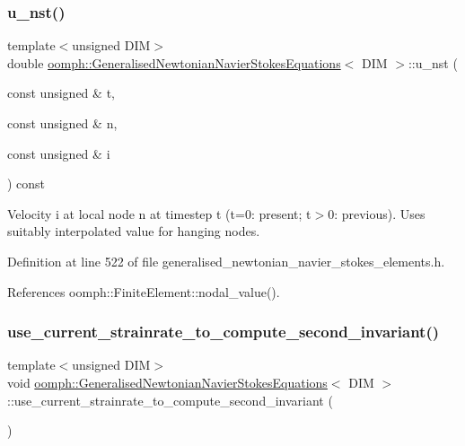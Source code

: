\subsubsection{\texorpdfstring{u\+\_\+nst()}{u\_nst()}\hspace{0.1cm}{\footnotesize\ttfamily [2/2]}}
{\footnotesize\ttfamily template$<$unsigned D\+IM$>$ \\
double \hyperlink{classoomph_1_1GeneralisedNewtonianNavierStokesEquations}{oomph\+::\+Generalised\+Newtonian\+Navier\+Stokes\+Equations}$<$ D\+IM $>$\+::u\+\_\+nst (\begin{DoxyParamCaption}\item[{const unsigned \&}]{t,  }\item[{const unsigned \&}]{n,  }\item[{const unsigned \&}]{i }\end{DoxyParamCaption}) const\hspace{0.3cm}{\ttfamily [inline]}}



Velocity i at local node n at timestep t (t=0\+: present; t$>$0\+: previous). Uses suitably interpolated value for hanging nodes. 



Definition at line 522 of file generalised\+\_\+newtonian\+\_\+navier\+\_\+stokes\+\_\+elements.\+h.



References oomph\+::\+Finite\+Element\+::nodal\+\_\+value().

\mbox{\label{classoomph_1_1GeneralisedNewtonianNavierStokesEquations_a802df1486155e87fcc92f1db750cec3c}} 
\subsubsection{\texorpdfstring{use\+\_\+current\+\_\+strainrate\+\_\+to\+\_\+compute\+\_\+second\+\_\+invariant()}{use\_current\_strainrate\_to\_compute\_second\_invariant()}}
{\footnotesize\ttfamily template$<$unsigned D\+IM$>$ \\
void \hyperlink{classoomph_1_1GeneralisedNewtonianNavierStokesEquations}{oomph\+::\+Generalised\+Newtonian\+Navier\+Stokes\+Equations}$<$ D\+IM $>$\+::use\+\_\+current\+\_\+strainrate\+\_\+to\+\_\+compute\+\_\+second\+\_\+invariant (\begin{DoxyParamCaption}{ }\end{DoxyParamCaption})\hspace{0.3cm}{\ttfamily [inline]}}



